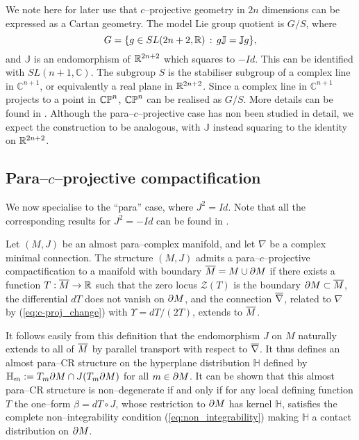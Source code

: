 We note here for later use that $c$--projective geometry in $2n$ dimensions can be expressed as a Cartan geometry. The model Lie group quotient is $G/S$, where
\[
G=\{g\in SL(2n+2,\mathbb{R})\,:\,g\mathbb{J}=\mathbb{J}g\},
\]
and $\mathbb{J}$ is an endomorphism of $\mathbb{R}^{2n+2}$ which squares to $-Id$. This can be identified with $SL(n+1,\mathbb{C})$. The subgroup $S$ is the stabiliser subgroup of a complex line in $\mathbb{C}^{n+1}$, or equivalently a real plane in $\mathbb{R}^{2n+2}$. Since a complex line in $\mathbb{C}^{n+1}$ projects to a point in $\mathbb{CP}^n$, $\mathbb{CP}^n$ can be realised as $G/S$. More details can be found in \cite{c_proj}. Although the para--$c$--projective case has non been studied in detail, we expect the construction to be analogous, with $\mathbb{J}$ instead squaring to the identity on $\mathbb{R}^{2n+2}$.

\subsection{Para--$c$--projective compactification}

We now specialise to the ``para'' case, where $J^2=Id$. Note that all the corresponding results for $J^2=-Id$ can be found in \cite{CG}.

\begin{defi}
\label{defi_1}  Let $(M,J)$ be an almost para--complex manifold, and let $\nabla$ be a complex minimal connection. The structure $(M,J)$ admits a para--$c$--projective compactification to a manifold with boundary $\overline{M}=M\cup\partial M$
if there exists a function $T:\overline{M}\rightarrow \mathbb{R}$ such that the zero locus $\mathcal{Z}(T)$ is the boundary
$\partial M\subset \overline{M}$, the differential $dT$ does not vanish on $\partial M$, and the connection $\overline{\nabla}$, related to $\nabla$ by (\ref{eq:c-proj_change}) with $\Upsilon = dT/(2T)$, extends to $\overline{M}$.
\end{defi}



It follows easily from this definition that the endomorphism $J$ on $M$ naturally extends to all of $\overline{M}$ by parallel transport with respect to $\overline{\nabla}$. It thus defines an almost para--CR structure on the hyperplane distribution $ \mathbb{H} $ defined by $ \mathbb{H} _m:=T_m\partial M \cap J(T_m \partial M)$ for all $m\in\partial M$. It can be shown that this almost para--CR structure is non--degenerate if and only if for any local defining function $T$ the one--form $\beta=dT\circ J$, whose restriction to $\partial M$ has kernel $ \mathbb{H} $, satisfies the complete non--integrability condition (\ref{eq:non_integrability}) making $ \mathbb{H} $ a contact distribution on $\partial M$.

